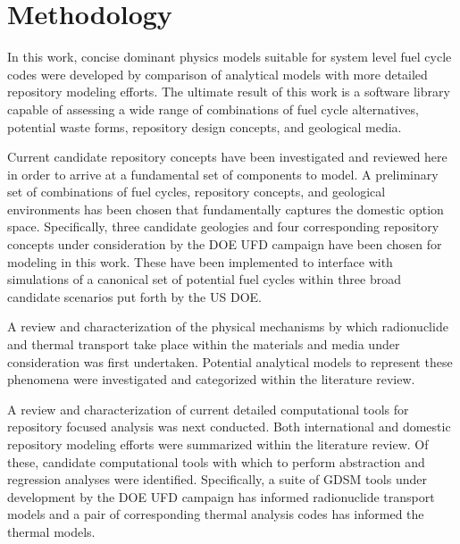 \section{Methodology} 


In this work, concise dominant physics models suitable for system level fuel 
cycle codes were developed by comparison of analytical models with more 
detailed repository modeling efforts. The ultimate result of this work is a 
software library capable of assessing a wide range of combinations 
of fuel cycle alternatives, potential waste forms, repository design concepts, 
and geological media. 


Current candidate repository concepts have been investigated and reviewed here 
in order to arrive at a fundamental set of components to model. A preliminary 
set of combinations of fuel cycles, repository concepts, and geological 
environments has 
been chosen that fundamentally captures the domestic option space. 
Specifically, three candidate geologies and four corresponding repository 
concepts under consideration by the \gls{DOE} \gls{UFD} campaign have been 
chosen for modeling in this work. These have been implemented to interface
with \Cyclus simulations of a canonical set of potential fuel cycles within 
three broad candidate scenarios put forth by the \gls{US} \gls{DOE}.


A review and characterization of the physical mechanisms by which radionuclide 
and thermal transport take place within the materials and media under 
consideration was first undertaken. Potential analytical models to represent  
these phenomena were investigated and categorized within the literature review. 


A review and characterization of current detailed computational tools for
repository focused analysis was next conducted. Both international and domestic
repository modeling efforts were summarized within the literature review. Of 
these, candidate computational tools with which to perform abstraction and 
regression analyses were identified. Specifically, a suite of \gls{GDSM} tools 
under development by the \gls{DOE} \gls{UFD} campaign has informed radionuclide 
transport models and a pair of corresponding thermal analysis codes has 
informed the thermal models.
 
